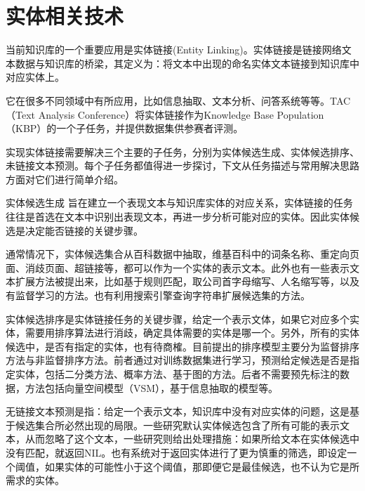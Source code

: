 \section{实体相关技术}
\label{sec:entity-research}

当前知识库的一个重要应用是实体链接(Entity Linking)。实体链接是链接网络文本数据与知识库的桥梁，其定义为：将文本中出现的命名实体文本链接到知识库中对应实体上。

它在很多不同领域中有所应用，比如信息抽取\cite{lin2012entity,nakashole2012patty}、文本分析\cite{gattani2013entity}、问答系统\cite{gattani2013entity,welty2012comparison}等等。TAC（Text Analysis Conference）将实体链接作为Knowledge Base Population（KBP）的一个子任务，并提供数据集供参赛者评测。

实现实体链接需要解决三个主要的子任务，分别为实体候选生成、实体候选排序、未链接文本预测。每个子任务都值得进一步探讨，下文从任务描述与常用解决思路方面对它们进行简单介绍。

{\heiti 实体候选生成} 旨在建立一个表现文本与知识库实体的对应关系，实体链接的任务往往是首选在文本中识别出表现文本，再进一步分析可能对应的实体。因此实体候选是决定能否链接的关键步骤。

通常情况下，实体候选集合从百科数据中抽取\cite{bunescu2006using,shen2012linden,shen2013linking}，维基百科中的词条名称、重定向页面、消歧页面、超链接等，都可以作为一个实体的表示文本。此外也有一些表示文本扩展方法被提出来，比如基于规则匹配\cite{han2009nlpr_kbp,lehmann2010lcc}，取公司首字母缩写、人名缩写等，以及有监督学习的方法\cite{zhang2011entity}。也有利用搜索引擎查询字符串扩展候选集的方法\cite{dredze2010entity, monahan2011cross}。

{\heiti 实体候选排序}是实体链接任务的关键步骤，给定一个表示文体，如果它对应多个实体，需要用排序算法进行消歧，确定具体需要的实体是哪一个。另外，所有的实体候选中，是否有指定的实体，也有待商榷。目前提出的排序模型主要分为监督排序方法与非监督排序方法。前者通过对训练数据集进行学习，预测给定候选是否是指定实体，包括二分类方法\cite{zhang2010entity,lehmann2010lcc,monahan2011cross,chen2011collaborative}、概率方法\cite{han2011generative}、基于图的方法\cite{han2011collective}。后者不需要预先标注的数据，方法包括向量空间模型（VSM）\cite{cucerzan2007large,han2009nlpr_kbp}，基于信息抽取的模型\cite{varma2009iiit,gottipati2011linking}等。

{\heiti 无链接文本预测}是指：给定一个表示文本，知识库中没有对应实体的问题，这是基于候选集合所必然出现的局限。一些研究默认实体候选包含了所有可能的表示文本，从而忽略了这个文本\cite{cucerzan2007large,kulkarni2009collective,shen2012liege}，一些研究则给出处理措施：如果所给文本在实体候选中没有匹配，就返回NIL\cite{varma2009iiit}。也有系统对于返回实体进行了更为慎重的筛选，即设定一个阈值，如果实体的可能性小于这个阈值，那即便它是最佳候选，也不认为它是所需求的实体\cite{han2009nlpr_kbp,lehmann2010lcc,han2011generative}。

